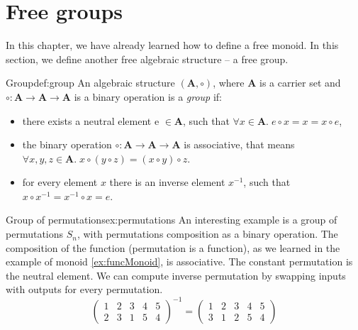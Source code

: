 \section{Free groups}
In this chapter, we have already learned how to define a free monoid. In this section, we define another free algebraic structure -- a free group.
\begin{defi}{Group}{def:group}
An algebraic structure $(\mathbf{A}, \circ)$, where $\mathbf{A}$ is a carrier set and $\circ: \mathbf{A} \rightarrow  \mathbf{A} \rightarrow \mathbf{A}$ is a binary operation is a \emph{group} \cite{AbstractAlgebra} if:
\begin{itemize}
    \itemsep 0em 
    \item there exists a neutral element e $\in \mathbf{A}$, such that $\forall x \in \mathbf{A}. \; e \circ x = x = x \circ e$,
    \item the binary operation $\circ: \mathbf{A} \rightarrow \mathbf{A} \rightarrow \mathbf{A}$ is associative, that means $\forall x, y, z \in \mathbf{A}. \; x \circ (y \circ z) = (x \circ y) \circ z$.
    \item for every element $x$ there is an inverse element $x^{-1}$, such that $x \circ x^{-1} = x^{-1} \circ x = e$.
\end{itemize}
\end{defi}
\begin{example}{Group of permutations}{ex:permutations}
An interesting example is a group of permutations $S_n$, with permutations composition as a binary operation. The composition of the function (permutation is a function), as we learned in the example of monoid \ref{ex:funcMonoid}, is associative. The constant permutation is the neutral element. We can compute inverse permutation by swapping inputs with outputs for every permutation.
$$
\begin{pmatrix}
    1 & 2 & 3 & 4 & 5 \\
    2 & 3 & 1 & 5 & 4
\end{pmatrix}^{-1}
=
\begin{pmatrix}
    1 & 2 & 3 & 4 & 5 \\
    3 & 1 & 2 & 5 & 4
\end{pmatrix}
$$
\end{example}
